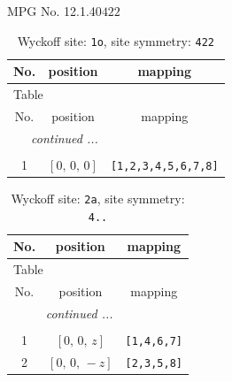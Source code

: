 \documentclass[fleqn,8pt]{jsarticle}
\begin{document}
\setcounter{MaxMatrixCols}{32}

\renewcommand{\tablename}{Table~}
\renewcommand{\figurename}{Figure~}
\begin{center}
\LARGE
MPG No. 12.1.40\quad$422$
\end{center}
\renewcommand{\arraystretch}{1.2}
\begin{longtable}{ccc}
\caption{Wyckoff site: {\tt 1o}, site symmetry: {\tt 422}}
 \\
 \hline \hline
No. & position & mapping \\ \hline \endfirsthead

\multicolumn{2}{l}{\tablename\ \thetable{}} \\
 \hline \hline
No. & position & mapping \\ \hline \endhead

 \hline \hline
\multicolumn{2}{r}{\footnotesize\it continued ...} \\ \endfoot

 \hline \hline
\multicolumn{2}{r}{} \\ \endlastfoot

1 & $\left[ 0,\, 0,\, 0 \right]$ & {\tt [1,2,3,4,5,6,7,8]} \\
\end{longtable}
\renewcommand{\arraystretch}{1.2}
\begin{longtable}{ccc}
\caption{Wyckoff site: {\tt 2a}, site symmetry: {\tt 4..}}
 \\
 \hline \hline
No. & position & mapping \\ \hline \endfirsthead

\multicolumn{2}{l}{\tablename\ \thetable{}} \\
 \hline \hline
No. & position & mapping \\ \hline \endhead

 \hline \hline
\multicolumn{2}{r}{\footnotesize\it continued ...} \\ \endfoot

 \hline \hline
\multicolumn{2}{r}{} \\ \endlastfoot

1 & $\left[ 0,\, 0,\, z \right]$ & {\tt [1,4,6,7]} \\ \hline
2 & $\left[ 0,\, 0,\, - z \right]$ & {\tt [2,3,5,8]} \\
\end{longtable}
\renewcommand{\arraystretch}{1.2}
\end{document}
